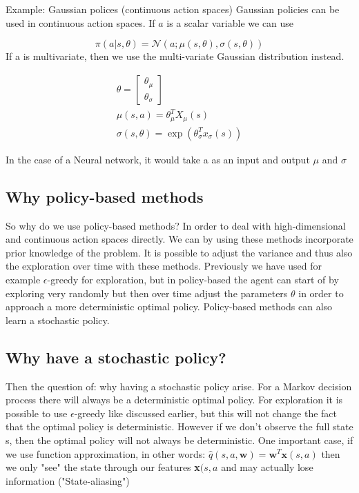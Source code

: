 \begin{example}{Example: Gaussian polices (continuous action spaces)}
Gaussian policies can be used in continuous action spaces. If $a$ is a scalar variable we can use 

	\begin{equation}
		\pi (a|s,\theta) = \mathcal{N}(a; \mu(s,\theta),\sigma(s,\theta))
	\end{equation}
If a is multivariate, then we use the multi-variate Gaussian distribution instead.

	\begin{equation}
	\begin{aligned}
		\theta = \begin{bmatrix} \theta_\mu \\ \theta_\sigma \end{bmatrix} \\ \mu(s,a) = \theta_\mu^{T} X_\mu(s) \\ \sigma(s,\theta) = \exp(\theta_\sigma^{T}x_\sigma(s))
	\end{aligned}
	\end{equation}

In the case of a Neural network, it would take a as an input and output $\mu$ and $\sigma$

\end{example}	


\subsection{Why policy-based methods}
So why do we use policy-based methods? In order to deal with high-dimensional and continuous action spaces directly. We can by using these methods incorporate prior knowledge of the problem. It is possible to adjust the variance and thus also the exploration over time with these methods. Previously we have used for example $\epsilon$-greedy for exploration, but in policy-based the agent can start of by exploring very randomly but then over time adjust the parameters $\theta$ in order to approach a more deterministic optimal policy. Policy-based methods can also learn a stochastic policy. 

\subsection{Why have a stochastic policy?}
Then the question of: why having a stochastic policy arise. For a Markov decision process there will always be a deterministic optimal policy. For exploration it is possible to use $\epsilon$-greedy like discussed earlier, but this will not change the fact that the optimal policy is deterministic. However if we don't observe the full state s, then the optimal policy will not always be deterministic. One important case, if we use function approximation, in other words: $\hat{q}(s,a,\textbf{w}) = \textbf{w}^{T}\textbf{x}(s,a)$ then we only "see" the state through our features \textbf{x}$(s,a$ and may actually lose information ("State-aliasing")


